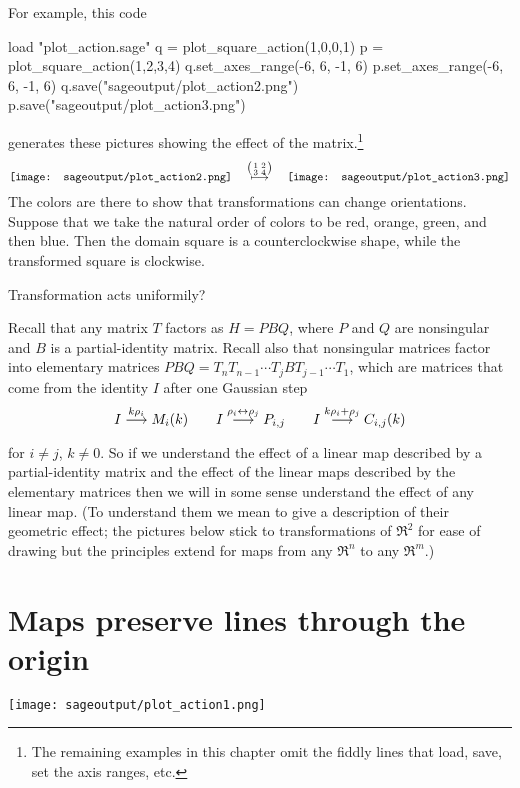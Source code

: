 For example, this code
\begin{sageoutput}
load "plot_action.sage"
q = plot_square_action(1,0,0,1) 
p = plot_square_action(1,2,3,4) 
q.set_axes_range(-6, 6, -1, 6) 
p.set_axes_range(-6, 6, -1, 6) 
q.save("sageoutput/plot_action2.png")
p.save("sageoutput/plot_action3.png")
\end{sageoutput}
\noindent generates these pictures showing the effect of the 
matrix.\footnote{The remaining examples in this chapter omit the 
fiddly lines that load, save, set the axis ranges, etc.}
\begin{equation*}
  \vcenteredhbox{\texttt{[image: sageoutput/plot\_action2.png]}}
  \quad\mapsunder{\big (\begin{smallmatrix} 1 &2 \\ 3 &4 \end{smallmatrix}\big )}\quad
  \vcenteredhbox{\texttt{[image: sageoutput/plot\_action3.png]}}
\end{equation*}
The colors are there to show that transformations can change
orientations.
Suppose that we take the natural order of colors to be red, orange, 
green, and then blue.
Then the domain square is a counterclockwise shape, while the transformed
square is clockwise.

Transformation acts uniformily?


Recall that any matrix $T$ factors as $H=PBQ$, 
where $P$ and $Q$ are nonsingular and $B$ is a partial-identity matrix.
Recall also that nonsingular matrices
factor into elementary matrices
$PBQ=T_nT_{n-1}\cdots T_jBT_{j-1}\cdots T_1$,
which are matrices that
come from the identity $I$ after one Gaussian step
\begin{equation*}
  I\mathrel{ \mathop{\longrightarrow}\limits^{k\rho_i\mathstrut}_{ \begin{subarray}{l} \relax \end{subarray}}}M_i(k) 
  \qquad 
  I\mathrel{ \mathop{\longrightarrow}\limits^{\rho_i\leftrightarrow\rho_j\mathstrut}_{ \begin{subarray}{l} \relax \end{subarray}}}P_{i,j}  
  \qquad
  I\mathrel{ \mathop{\longrightarrow}\limits^{k\rho_i+\rho_j\mathstrut}_{ \begin{subarray}{l} \relax \end{subarray}}}C_{i,j}(k) 
\end{equation*}
for $i\neq j$, $k\neq 0$.
So if we understand the effect of a linear map described
by a partial-identity matrix and the effect of the linear maps
described by the elementary matrices then we will in some sense
understand the effect of any linear map.
(To understand them we mean to give a description of their geometric effect;
the pictures below stick to transformations of $\Re^2$ for ease of drawing
but the principles extend for maps from any $\Re^n$ to any $\Re^m$.)







\section{Maps preserve lines through the origin}







\begin{center}
  \texttt{[image: sageoutput/plot\_action1.png]}
\end{center}

\endinput


TODO:
